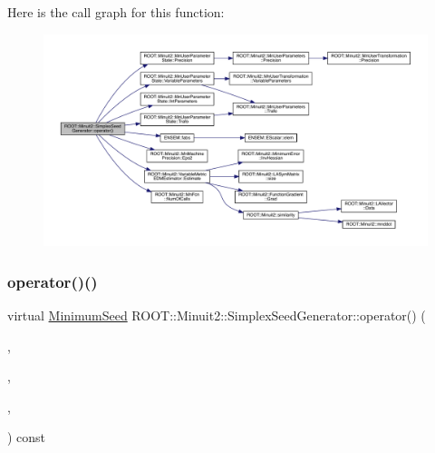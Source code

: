 Here is the call graph for this function\+:\nopagebreak
\begin{figure}[H]
\begin{center}
\leavevmode
\includegraphics[width=350pt]{d3/d36/classROOT_1_1Minuit2_1_1SimplexSeedGenerator_aa0c427acb85f9a47a0abaecbf85b1f5c_cgraph}
\end{center}
\end{figure}
\mbox{\label{classROOT_1_1Minuit2_1_1SimplexSeedGenerator_a48f1bb260753e6c6f053072d4754a028}} 
\subsubsection{\texorpdfstring{operator()()}{operator()()}\hspace{0.1cm}{\footnotesize\ttfamily [2/4]}}
{\footnotesize\ttfamily virtual \mbox{\hyperlink{classROOT_1_1Minuit2_1_1MinimumSeed}{Minimum\+Seed}} R\+O\+O\+T\+::\+Minuit2\+::\+Simplex\+Seed\+Generator\+::operator() (\begin{DoxyParamCaption}\item[{const \mbox{\hyperlink{classROOT_1_1Minuit2_1_1MnFcn}{Mn\+Fcn}} \&}]{,  }\item[{const \mbox{\hyperlink{classROOT_1_1Minuit2_1_1GradientCalculator}{Gradient\+Calculator}} \&}]{,  }\item[{const \mbox{\hyperlink{classROOT_1_1Minuit2_1_1MnUserParameterState}{Mn\+User\+Parameter\+State}} \&}]{,  }\item[{const \mbox{\hyperlink{classROOT_1_1Minuit2_1_1MnStrategy}{Mn\+Strategy}} \&}]{ }\end{DoxyParamCaption}) const\hspace{0.3cm}{\ttfamily [virtual]}}



